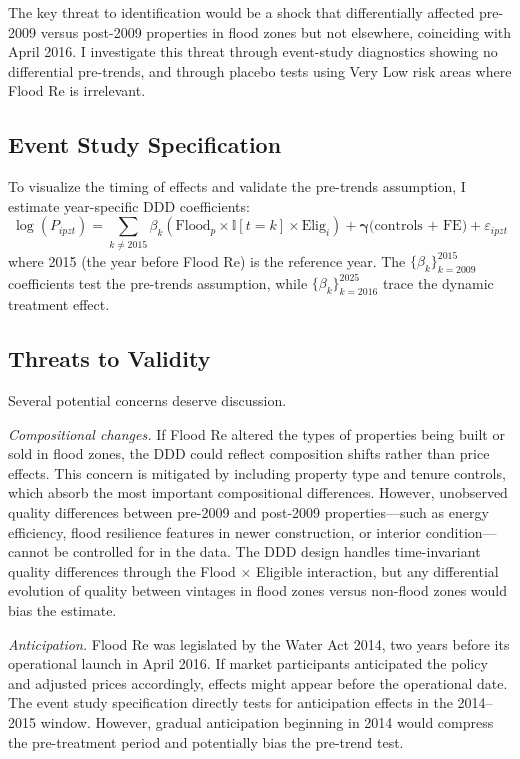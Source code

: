 \documentclass[12pt]{article}
\newcommand{\ind}{\mathbb{I}}
\begin{document}
The key threat to identification would be a shock that differentially affected pre-2009 versus post-2009 properties in flood zones but not elsewhere, coinciding with April 2016. I investigate this threat through event-study diagnostics showing no differential pre-trends, and through placebo tests using Very Low risk areas where Flood Re is irrelevant.

\subsection{Event Study Specification}

To visualize the timing of effects and validate the pre-trends assumption, I estimate year-specific DDD coefficients:
\begin{equation}
\log(P_{ipzt}) = \sum_{k \neq 2015} \beta_k (\text{Flood}_p \times \ind[t=k] \times \text{Elig}_i) + \boldsymbol{\gamma} \text{(controls + FE)} + \varepsilon_{ipzt}
\label{eq:event}
\end{equation}
where 2015 (the year before Flood Re) is the reference year. The $\{\beta_k\}_{k=2009}^{2015}$ coefficients test the pre-trends assumption, while $\{\beta_k\}_{k=2016}^{2025}$ trace the dynamic treatment effect.

\subsection{Threats to Validity}

Several potential concerns deserve discussion.

\textit{Compositional changes.} If Flood Re altered the types of properties being built or sold in flood zones, the DDD could reflect composition shifts rather than price effects. This concern is mitigated by including property type and tenure controls, which absorb the most important compositional differences. However, unobserved quality differences between pre-2009 and post-2009 properties---such as energy efficiency, flood resilience features in newer construction, or interior condition---cannot be controlled for in the data. The DDD design handles time-invariant quality differences through the Flood $\times$ Eligible interaction, but any differential evolution of quality between vintages in flood zones versus non-flood zones would bias the estimate.

\textit{Anticipation.} Flood Re was legislated by the Water Act 2014, two years before its operational launch in April 2016. If market participants anticipated the policy and adjusted prices accordingly, effects might appear before the operational date. The event study specification directly tests for anticipation effects in the 2014--2015 window. However, gradual anticipation beginning in 2014 would compress the pre-treatment period and potentially bias the pre-trend test.
\end{document}
